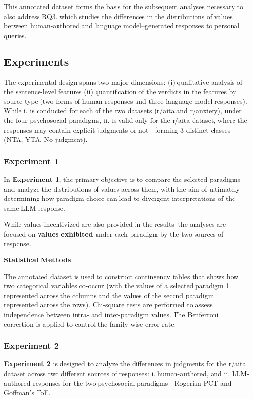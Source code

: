 This annotated dataset forms the basis for the subsequent analyses necessary to also address RQ3, which studies the differences in the distributions of values between human-authored and language model–generated responses to personal queries.

\subsection{Experiments}
The experimental design spans two major dimensions: (i) qualitative analysis of the sentence-level features (ii) quantification of the verdicts in the features by source type (two forms of human responses and three language model responses). While i. is conducted for each of the two datasets (r/aita and r/anxiety), under the four psychosocial paradigms, ii. is valid only for the r/aita dataset, where the responses may contain explicit judgments or not - forming 3 distinct classes (NTA, YTA, No judgment).

\subsubsection{Experiment 1}
In \textbf{Experiment 1}, the primary objective is to compare the selected paradigms and analyze the distributions of values across them, with the aim of ultimately determining how paradigm choice can lead to divergent interpretations of the same LLM response.

While values incentivized are also provided in the results, the analyses are focused on \textbf{values exhibited} under each paradigm by the two sources of response.

\smallskip \textbf{Statistical Methods}

The annotated dataset is used to construct contingency tables that shows how two categorical variables co-occur (with the values of a selected paradigm 1 represented across the columns and the values of the second paradigm represented across the rows). Chi-square tests are performed to assess independence between intra- and inter-paradigm values. The Benferroni correction is applied to control the family-wise error rate.


\subsubsection{Experiment 2}
\textbf{Experiment 2} is designed to analyze the differences in judgments for the r/aita dataset across two different sources of responses: i. human-authored, and ii. LLM-authored responses for the two psychosocial paradigms - Rogerian PCT and Goffman's ToF.

